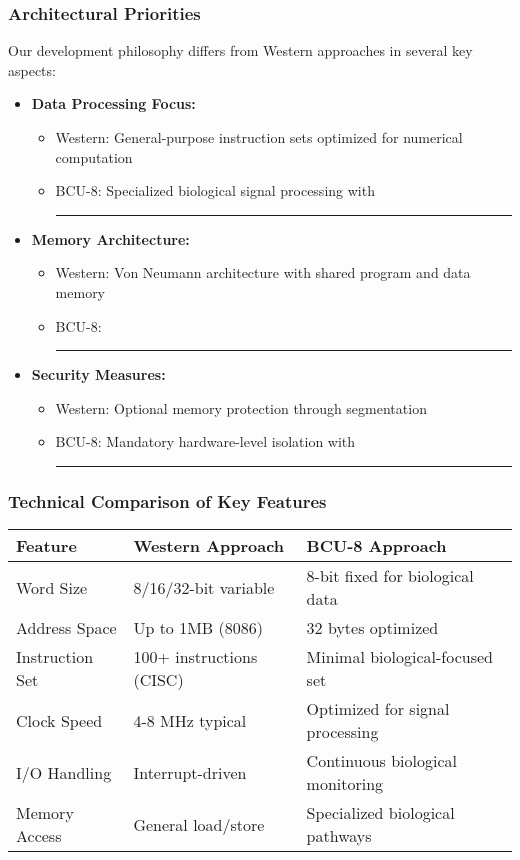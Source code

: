 \documentclass[12pt]{article}
\begin{document}
\subsubsection{Architectural Priorities}
Our development philosophy differs from Western approaches in several key aspects:
\begin{itemize}
    \item \textbf{Data Processing Focus:}
        \begin{itemize}
            \item Western: General-purpose instruction sets optimized for numerical computation
            \item BCU-8: Specialized biological signal processing with \rule{55mm}{3.5mm}
        \end{itemize}
    \item \textbf{Memory Architecture:}
        \begin{itemize}
            \item Western: Von Neumann architecture with shared program and data memory
            \item BCU-8: \rule{85mm}{3.5mm}
        \end{itemize}
    \item \textbf{Security Measures:}
        \begin{itemize}
            \item Western: Optional memory protection through segmentation
            \item BCU-8: Mandatory hardware-level isolation with \rule{65mm}{3.5mm}
        \end{itemize}
\end{itemize}

\subsubsection{Technical Comparison of Key Features}
\begin{center}
\begin{tabular}{|l|l|l|}
\hline
\textbf{Feature} & \textbf{Western Approach} & \textbf{BCU-8 Approach} \\
\hline
Word Size & 8/16/32-bit variable & 8-bit fixed for biological data \\
Address Space & Up to 1MB (8086) & 32 bytes optimized \\
Instruction Set & 100+ instructions (CISC) & Minimal biological-focused set \\
Clock Speed & 4-8 MHz typical & Optimized for signal processing \\
I/O Handling & Interrupt-driven & Continuous biological monitoring \\
Memory Access & General load/store & Specialized biological pathways \\
\hline
\end{tabular}
\end{center}
\end{document}
